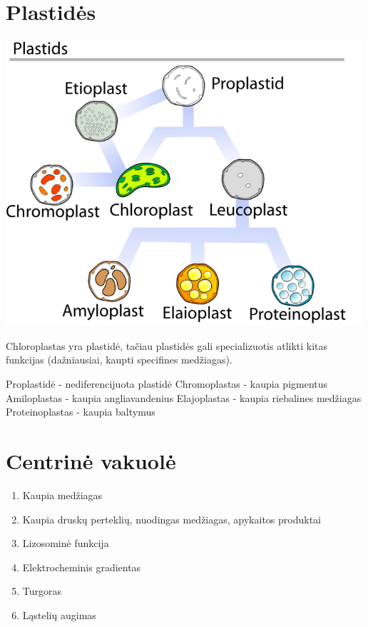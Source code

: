 \documentclass[]{book}
\providecommand{\tightlist}{%
  \setlength{\itemsep}{0pt}\setlength{\parskip}{0pt}}
\begin{document}
\hypertarget{plastides}{%
\section{Plastidės}\label{plastides}}

\includegraphics[width=500px]{static/augalai/plastids}

Chloroplastas yra plastidė, tačiau plastidės gali specializuotis atlikti kitas funkcijas (dažniausiai, kaupti specifines medžiagas).

Proplastidė - nediferencijuota plastidė
Chromoplastas - kaupia pigmentus
Amiloplastas - kaupia angliavandenius
Elajoplastas - kaupia riebalines medžiagas
Proteinoplastas - kaupia baltymus

\hypertarget{centrine-vakuole}{%
\section{Centrinė vakuolė}\label{centrine-vakuole}}

\begin{enumerate}
\def\labelenumi{\arabic{enumi}.}
\tightlist
\item
  Kaupia medžiagas
\item
  Kaupia druskų perteklių, nuodingas medžiagas, apykaitos produktai
\item
  Lizosominė funkcija
\item
  Elektrocheminis gradientas
\item
  Turgoras
\item
  Ląstelių augimas
\end{enumerate}
\end{document}
